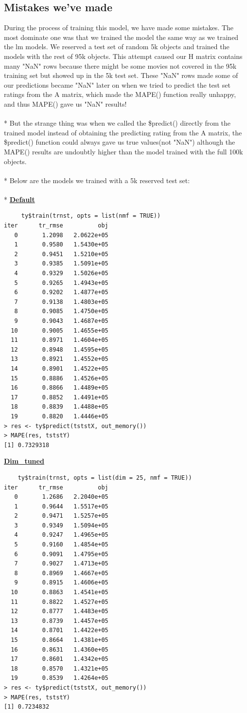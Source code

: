 \documentclass[11pt]{article}
\newcommand\tab[1][0.5cm]{\hspace*{#1}}
\begin{document}
\subsection{Mistakes we've made}
\tab{}During the process of training this model, we have made some mistakes. The most dominate one was that we trained the model the same way as we trained the lm models. 
We reserved a test set of random 5k objects and trained the models with the rest of 95k objects. This attempt caused our H matrix contains many "NaN" rows because there might be some movies not covered in the 95k training set but showed up in the 5k test set. These "NaN" rows made some of our predictions became "NaN" later on when we tried to predict the test set ratings from the A matrix, which made the MAPE() function really unhappy, and thus MAPE() gave us "NaN" results!
\\\\*
\tab{}But the strange thing was when we called the \$predict() directly from the trained model instead of obtaining the predicting rating from the A matrix, the \$predict() function could always gave us true values(not "NaN") although the MAPE() results are undoubtly higher than the model trained with the full 100k objects.
\\\\*
\tab{}Below are the models we trained with a 5k reserved test set:
\\\\*
\textbf{\underline{Default}}
\begin{verbatim}
     ty$train(trnst, opts = list(nmf = TRUE))
iter      tr_rmse          obj
   0       1.2098   2.0622e+05
   1       0.9580   1.5430e+05
   2       0.9451   1.5210e+05
   3       0.9385   1.5091e+05
   4       0.9329   1.5026e+05
   5       0.9265   1.4943e+05
   6       0.9202   1.4877e+05
   7       0.9138   1.4803e+05
   8       0.9085   1.4750e+05
   9       0.9043   1.4687e+05
  10       0.9005   1.4655e+05
  11       0.8971   1.4604e+05
  12       0.8948   1.4595e+05
  13       0.8921   1.4552e+05
  14       0.8901   1.4522e+05
  15       0.8886   1.4526e+05
  16       0.8866   1.4489e+05
  17       0.8852   1.4491e+05
  18       0.8839   1.4488e+05
  19       0.8820   1.4446e+05
> res <- ty$predict(tststX, out_memory())
> MAPE(res, tststY)
[1] 0.7329318
\end{verbatim}
\textbf{\underline{Dim\_tuned}}
\begin{verbatim}
    ty$train(trnst, opts = list(dim = 25, nmf = TRUE))
iter      tr_rmse          obj
   0       1.2686   2.2040e+05
   1       0.9644   1.5517e+05
   2       0.9471   1.5257e+05
   3       0.9349   1.5094e+05
   4       0.9247   1.4965e+05
   5       0.9160   1.4854e+05
   6       0.9091   1.4795e+05
   7       0.9027   1.4713e+05
   8       0.8969   1.4667e+05
   9       0.8915   1.4606e+05
  10       0.8863   1.4541e+05
  11       0.8822   1.4527e+05
  12       0.8777   1.4483e+05
  13       0.8739   1.4457e+05
  14       0.8701   1.4422e+05
  15       0.8664   1.4381e+05
  16       0.8631   1.4360e+05
  17       0.8601   1.4342e+05
  18       0.8570   1.4321e+05
  19       0.8539   1.4264e+05
> res <- ty$predict(tststX, out_memory())
> MAPE(res, tststY)
[1] 0.7234832
\end{verbatim}
\end{document}
